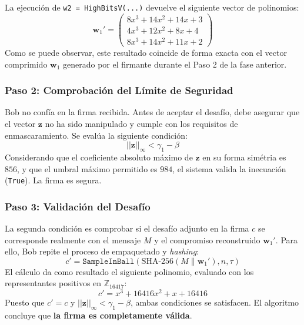 \documentclass[11pt, a4paper]{report}
\theoremstyle{definition}
\begin{document}
La ejecución de \texttt{w2 = HighBitsV(...)} devuelve el siguiente vector de polinomios:
\begin{equation}
    \mathbf{w}_1' = \begin{pmatrix}
    8x^3 + 14x^2 + 14x + 3 \\
    4x^3 + 12x^2 + 8x + 4 \\
    8x^3 + 14x^2 + 11x + 2
    \end{pmatrix}
\end{equation}
Como se puede observar, este resultado coincide de forma exacta con el vector comprimido $\mathbf{w}_1$ generado por el firmante durante el Paso 2 de la fase anterior.

\subsubsection*{Paso 2: Comprobación del Límite de Seguridad}
Bob no confía en la firma recibida. Antes de aceptar el desafío, debe asegurar que el vector $\mathbf{z}$ no ha sido manipulado y cumple con los requisitos de enmascaramiento. Se evalúa la siguiente condición:
\begin{equation}
    ||\mathbf{z}||_\infty < \gamma_1 - \beta
\end{equation}
Considerando que el coeficiente absoluto máximo de $\mathbf{z}$ en su forma simétria es $856$, y que el umbral máximo permitido es $984$, el sistema valida la inecuación (\texttt{True}). La firma es segura.

\subsubsection*{Paso 3: Validación del Desafío}
La segunda condición es comprobar si el desafío adjunto en la firma $c$ se corresponde realmente con el mensaje $M$ y el compromiso reconstruido $\mathbf{w}_1'$. Para ello, Bob repite el proceso de empaquetado y \textit{hashing}:
\begin{equation}
    c' = \texttt{SampleInBall}(\text{SHA-256}(M \parallel \mathbf{w}_1'), n, \tau)
\end{equation}
El cálculo da como resultado el siguiente polinomio, evaluado con los representantes positivos en $\mathbb{Z}_{16417}$:
\begin{equation}
    c' = x^3 + 16416x^2 + x + 16416
\end{equation}
Puesto que $c' = c$ y $||\mathbf{z}||_\infty < \gamma_1 - \beta$, ambas condiciones se satisfacen. El algoritmo concluye que \textbf{la firma es completamente válida}.
\end{document}
